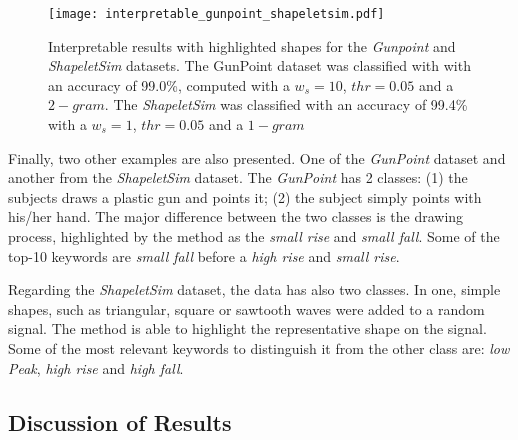 \begin{figure}[h]
    \centering
    \texttt{[image: interpretable\_gunpoint\_shapeletsim.pdf]}
    \caption{Interpretable results with highlighted shapes for the \textit{Gunpoint} and \textit{ShapeletSim} datasets. The GunPoint dataset was classified with with an accuracy of 99.0\%, computed with a $w_s=10$, $thr=0.05$ and a $2-gram$. The \textit{ShapeletSim} was classified with an accuracy of 99.4\% with a $w_s=1$, $thr=0.05$ and a $1-gram$}
    \label{fig:interpretable3}
\end{figure}

Finally, two other examples are also presented. One of the \textit{GunPoint} dataset and another from the \textit{ShapeletSim} dataset. The \textit{GunPoint} has 2 classes: (1) the subjects draws a plastic gun and points it; (2) the subject simply points with his/her hand. The major difference between the two classes is the drawing process, highlighted by the method as the \textit{small rise} and \textit{small fall}. Some of the top-10 keywords are \textit{small fall} before a \textit{high rise} and \textit{small rise}.
\par
Regarding the \textit{ShapeletSim} dataset, the data has also two classes. In one, simple shapes, such as triangular, square or sawtooth waves were added to a random signal. The method is able to highlight the representative shape on the signal. Some of the most relevant keywords to distinguish it from the other class are: \textit{low Peak}, \textit{high rise} and \textit{high fall}. 

\subsection{Discussion of Results}

